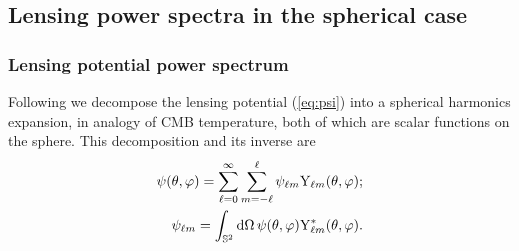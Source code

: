 \documentclass[fleqn,usenatbib]{mnras} %
\begin{document}
\subsection{Lensing power spectra in the spherical case}

\subsubsection{Lensing potential power spectrum}

Following \cite{2000PhRvD..62d3007H} we decompose the lensing potential
(\ref{eq:psi}) into a spherical harmonics expansion, in analogy of CMB
temperature, both of which are scalar functions on the sphere. This
decomposition and its inverse are
%
%
\begin{align}
  \psi(\theta, \varphi) = \sum_{\ell=0}^\infty \sum_{m=-\ell}^\ell \psi_{\ell m} {\rm Y}_{\ell m}(\theta, \varphi);
    \label{eq:psi_harm_exp}
    \\
  \psi_{\ell m} = \int_{\mathbb{S}^2} {\rm d} \Omega \, \psi(\theta, \varphi) {\rm Y}^\ast_{\ell m}(\theta, \varphi).
  \label{eq:psi_harm_exp_inv}
\end{align}
\end{document}
